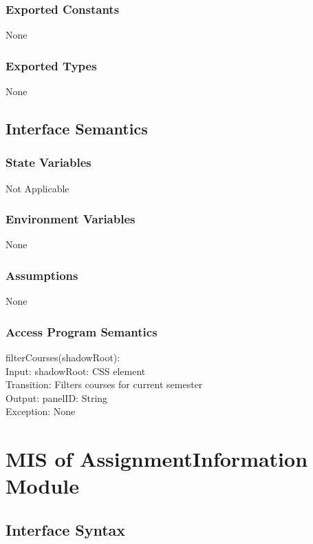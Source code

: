 \documentclass[12pt, titlepage]{article}
\begin{document}
\subsubsection{Exported Constants}
None
\subsubsection{Exported Types}
None
\subsection{Interface Semantics}
\subsubsection{State Variables}
Not Applicable
\subsubsection{Environment Variables}
None
\subsubsection{Assumptions}
None
\subsubsection{Access Program Semantics}
filterCourses(shadowRoot):\\
    
    Input: shadowRoot: CSS element\\

    Transition: Filters courses for current semester\\
    
    Output: panelID: String\\

    Exception: None\\


\newpage




\section{MIS of AssignmentInformation Module}
\subsection{Interface Syntax}
\end{document}

